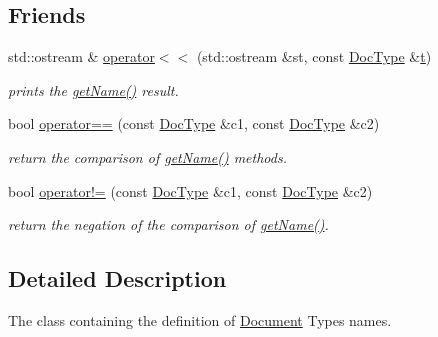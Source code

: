 \subsection*{Friends}
\begin{DoxyCompactItemize}
\item 
\hypertarget{classdocs_1_1DocType_ab7f2e778c65c36835a714e77aa2c3a09}{std\-::ostream \& \hyperlink{classdocs_1_1DocType_ab7f2e778c65c36835a714e77aa2c3a09}{operator$<$$<$} (std\-::ostream \&st, const \hyperlink{classdocs_1_1DocType}{Doc\-Type} \&\hyperlink{classdocs_1_1DocType_a58ced824f3508e8f8d73b1ff1bfefc0a}{t})}\label{classdocs_1_1DocType_ab7f2e778c65c36835a714e77aa2c3a09}

\begin{DoxyCompactList}\small\item\em prints the \hyperlink{classdocs_1_1DocType_a4632fc57ed71ebb984aa8dd78017db03}{get\-Name()} result. \end{DoxyCompactList}\item 
\hypertarget{classdocs_1_1DocType_aa68c01dc0d9b0494723b223bf52a6acf}{bool \hyperlink{classdocs_1_1DocType_aa68c01dc0d9b0494723b223bf52a6acf}{operator==} (const \hyperlink{classdocs_1_1DocType}{Doc\-Type} \&c1, const \hyperlink{classdocs_1_1DocType}{Doc\-Type} \&c2)}\label{classdocs_1_1DocType_aa68c01dc0d9b0494723b223bf52a6acf}

\begin{DoxyCompactList}\small\item\em return the comparison of \hyperlink{classdocs_1_1DocType_a4632fc57ed71ebb984aa8dd78017db03}{get\-Name()} methods. \end{DoxyCompactList}\item 
\hypertarget{classdocs_1_1DocType_a6f7b8c51d3dc0ec95808119766eb8010}{bool \hyperlink{classdocs_1_1DocType_a6f7b8c51d3dc0ec95808119766eb8010}{operator!=} (const \hyperlink{classdocs_1_1DocType}{Doc\-Type} \&c1, const \hyperlink{classdocs_1_1DocType}{Doc\-Type} \&c2)}\label{classdocs_1_1DocType_a6f7b8c51d3dc0ec95808119766eb8010}

\begin{DoxyCompactList}\small\item\em return the negation of the comparison of \hyperlink{classdocs_1_1DocType_a4632fc57ed71ebb984aa8dd78017db03}{get\-Name()}. \end{DoxyCompactList}\end{DoxyCompactItemize}


\subsection{Detailed Description}
The class containing the definition of \hyperlink{classdocs_1_1Document}{Document} Types names. 

